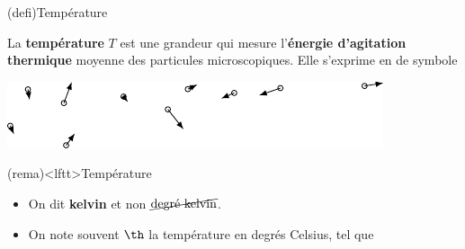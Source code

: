 \documentclass[../../main/main.tex]{subfiles}
\begin{document}
\begin{tcb}(defi){Température}
	\noindent
	\begin{minipage}[c]{.70\linewidth}
		La \textbf{température} $T$ est une grandeur qui mesure l'\textbf{énergie
			d'agitation thermique} moyenne des particules microscopiques. Elle
		s'exprime en  de symbole 
	\end{minipage}
	\hfill
	\begin{minipage}[c]{.27\linewidth}
		\vspace{0pt}
		\begin{center}
			\includegraphics[width=\linewidth]{temp_sch}
		\end{center}
	\end{minipage}
\end{tcb}
\begin{tcb}(rema)<lftt>{Température}
	\begin{itemize}
		\item On dit \textbf{kelvin} et non $\cancel{\text{degré kelvin}}$.
		\item On note souvent $\th$ la température en degrés Celsius, tel que
		      \psw{%
			      \[
				      \setlength{\fboxsep}{3mm}
				      \boxed{\th = T - \SI{273.15}{K}}
			      \]
		      }%
		      \vspace*{-15pt}
	\end{itemize}
	\vspace*{-15pt}
\end{tcb}
\end{document}
